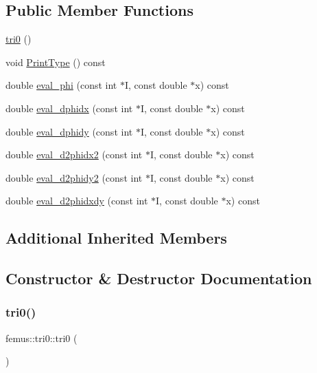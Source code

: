 \subsection*{Public Member Functions}
\begin{DoxyCompactItemize}
\item 
\mbox{\hyperlink{classfemus_1_1tri0_a9bf4fa02f21610de38c1123ebcff383b}{tri0}} ()
\item 
void \mbox{\hyperlink{classfemus_1_1tri0_af9e3d9ca27a7fcfef65802eb7ef3f21d}{Print\+Type}} () const
\item 
double \mbox{\hyperlink{classfemus_1_1tri0_a8f439eb29f090a59be31e84de793853b}{eval\+\_\+phi}} (const int $\ast$I, const double $\ast$x) const
\item 
double \mbox{\hyperlink{classfemus_1_1tri0_a5c6b15a2746a2d9b8b00d695644a3069}{eval\+\_\+dphidx}} (const int $\ast$I, const double $\ast$x) const
\item 
double \mbox{\hyperlink{classfemus_1_1tri0_ac2d4659f00d3f914c7f29166f2e2ba71}{eval\+\_\+dphidy}} (const int $\ast$I, const double $\ast$x) const
\item 
double \mbox{\hyperlink{classfemus_1_1tri0_ae832dd28eb7437215ce49ce0bac98ba3}{eval\+\_\+d2phidx2}} (const int $\ast$I, const double $\ast$x) const
\item 
double \mbox{\hyperlink{classfemus_1_1tri0_aa01de141909bc67c1f293184b35d444b}{eval\+\_\+d2phidy2}} (const int $\ast$I, const double $\ast$x) const
\item 
double \mbox{\hyperlink{classfemus_1_1tri0_af109d0128644bcac07a88dfba1f457b4}{eval\+\_\+d2phidxdy}} (const int $\ast$I, const double $\ast$x) const
\end{DoxyCompactItemize}
\subsection*{Additional Inherited Members}


\subsection{Constructor \& Destructor Documentation}
\mbox{\label{classfemus_1_1tri0_a9bf4fa02f21610de38c1123ebcff383b}} 
\subsubsection{\texorpdfstring{tri0()}{tri0()}}
{\footnotesize\ttfamily femus\+::tri0\+::tri0 (\begin{DoxyParamCaption}{ }\end{DoxyParamCaption})\hspace{0.3cm}{\ttfamily [inline]}}



